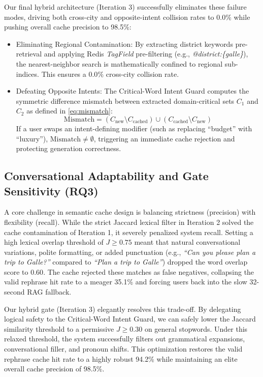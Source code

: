 \documentclass{ieeeaccess}
\begin{document}
Our final hybrid architecture (Iteration 3) successfully eliminates these failure modes, driving both cross-city and opposite-intent collision rates to {0.0\%} while pushing overall cache precision to {98.5\%}:
\begin{itemize}
    \item {Eliminating Regional Contamination}: By extracting district keywords pre-retrieval and applying Redis \emph{TagField} pre-filtering (e.g., \emph{@district:\{galle\}}), the nearest-neighbor search is mathematically confined to regional sub-indices. This ensures a $0.0\%$ cross-city collision rate.
    \item {Defeating Opposite Intents}: The Critical-Word Intent Guard computes the symmetric difference mismatch between extracted domain-critical sets $C_1$ and $C_2$ as defined in \eqref{eq:mismatch}:
    \begin{equation}
\label{eq:mismatch}
        \text{Mismatch} = (C_{\text{new}} \setminus C_{\text{cached}}) \cup (C_{\text{cached}} \setminus C_{\text{new}})
    \end{equation}
    If a user swaps an intent-defining modifier (such as replacing ``budget'' with ``luxury''), $\text{Mismatch} \neq \emptyset$, triggering an immediate cache rejection and protecting generation correctness.
\end{itemize}

\subsection{Conversational Adaptability and Gate Sensitivity (RQ3)}
A core challenge in semantic cache design is balancing strictness (precision) with flexibility (recall). While the strict Jaccard lexical filter in Iteration 2 solved the cache contamination of Iteration 1, it severely penalized system recall. Setting a high lexical overlap threshold of $J \ge 0.75$ meant that natural conversational variations, polite formatting, or added punctuation (e.g., \emph{``Can you please plan a trip to Galle?''} compared to \emph{``Plan a trip to Galle''}) dropped the word overlap score to {0.60}. The cache rejected these matches as false negatives, collapsing the valid rephrase hit rate to a meager {35.1\%} and forcing users back into the slow 32-second RAG fallback.

Our hybrid gate (Iteration 3) elegantly resolves this trade-off. By delegating logical safety to the Critical-Word Intent Guard, we can safely lower the Jaccard similarity threshold to a permissive \textbf{$J \ge 0.30$} on general stopwords. Under this relaxed threshold, the system successfully filters out grammatical expansions, conversational filler, and pronoun shifts. This optimization restores the valid rephrase cache hit rate to a highly robust {94.2\%} while maintaining an elite overall cache precision of {98.5\%}.
\end{document}
